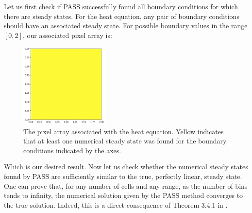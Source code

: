 \documentclass[11pt]{article}
\begin{document}
Let us first check if PASS successfully found all boundary conditions for which there are steady states. For the heat equation, any pair of boundary conditions should have an associated steady state. For possible boundary values in the range $[0,2]$, our associated pixel array is:

\begin{figure}[h]
\centering
\includegraphics[width=4.5cm]{images/heatGood.png}
\caption{The pixel array associated with the heat equation. Yellow indicates that at least one numerical steady state was found for the boundary conditions indicated by the axes.}
\label{heatPixel}
\end{figure}

Which is our desired result. Now let us check whether the numerical steady states found by PASS are sufficiently similar to the true, perfectly linear, steady state. One can prove that, for any number of cells and any range, as the number of bins tends to infinity, the numerical solution given by the PASS method converges to the true solution. Indeed, this is a direct consequence of Theorem 3.4.1 in \citep{Introduction_to_PA}.
%
%
%
%
\end{document}
